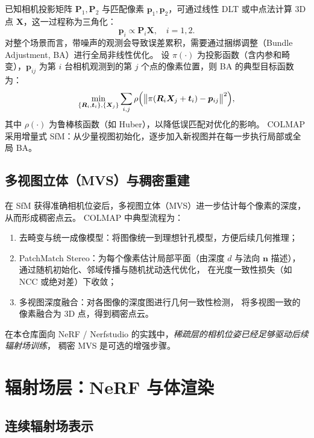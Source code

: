 \documentclass[12pt]{ctexart}
\begin{document}
已知相机投影矩阵 $\bm{P}_1,\bm{P}_2$ 与匹配像素 $\bm{p}_1,\bm{p}_2$，可通过线性 DLT 或中点法计算 3D 点
$\bm{X}$，这一过程称为三角化：
\begin{equation}
  \bm{p}_i \propto \bm{P}_i \bm{X}, \quad i=1,2.
\end{equation}
对整个场景而言，带噪声的观测会导致误差累积，需要通过捆绑调整（Bundle Adjustment, BA）进行全局非线性优化。
设 $\pi(\cdot)$ 为投影函数（含内参和畸变），$\bm{p}_{ij}$ 为第 $i$ 台相机观测到的第 $j$ 个点的像素位置，则
BA 的典型目标函数为：
\begin{equation}
  \min_{\{\bm{R}_i,\bm{t}_i\},\{\bm{X}_j\}}
  \sum_{i,j} \rho\Bigl(
    \bigl\|
      \pi(\bm{R}_i \bm{X}_j + \bm{t}_i) - \bm{p}_{ij}
    \bigr\|^2
  \Bigr),
\end{equation}
其中 $\rho(\cdot)$ 为鲁棒核函数（如 Huber），以降低误匹配对优化的影响。
COLMAP 采用增量式 SfM：从少量视图初始化，逐步加入新视图并在每一步执行局部或全局 BA。

\subsection{多视图立体（MVS）与稠密重建}

在 SfM 获得准确相机位姿后，多视图立体（MVS）进一步估计每个像素的深度，从而形成稠密点云。
COLMAP 中典型流程为：
\begin{enumerate}
  \item 去畸变与统一成像模型：将图像统一到理想针孔模型，方便后续几何推理；
  \item PatchMatch Stereo：为每个像素估计局部平面（由深度 $d$ 与法向 $\bm{n}$ 描述），
        通过随机初始化、邻域传播与随机扰动迭代优化，
        在光度一致性损失（如 NCC 或绝对差）下收敛；
  \item 多视图深度融合：对各图像的深度图进行几何一致性检测，
        将多视图一致的像素融合为 3D 点，得到稠密点云。
\end{enumerate}

在本仓库面向 NeRF / Nerfstudio 的实践中，\emph{稀疏层的相机位姿已经足够驱动后续辐射场训练}，
稠密 MVS 是可选的增强步骤。

\section{辐射场层：NeRF 与体渲染}

\subsection{连续辐射场表示}
\end{document}
